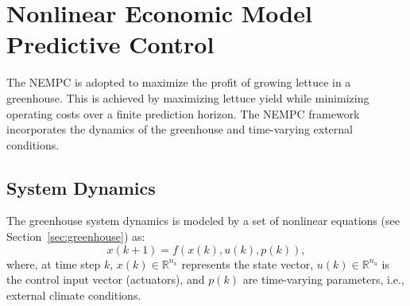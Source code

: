 \documentclass[conference]{IEEEtran}
\newcommand{\ui}[2]{#1_{\mathrm{#2}}}
\newcommand{\coo}{\ensuremath{\mathrm{CO_2}}}
\begin{document}







%
\section{Nonlinear Economic Model Predictive Control}\label{sec:mpc}
The NEMPC is adopted to maximize the profit of growing lettuce in a greenhouse. This is achieved by maximizing lettuce yield while minimizing operating costs over a finite prediction horizon. The NEMPC framework incorporates the dynamics of the greenhouse and time-varying external conditions.

\subsection{System Dynamics}\label{subsec:mpc_dynamics}
The greenhouse system dynamics is modeled by a set of nonlinear equations (see Section~\ref{sec:greenhouse}) as:
\begin{equation}
    x(k+1) = f\left( x(k), u(k), p(k) \right),
\end{equation}
where, at time step \(k\), \(x(k) \in \mathbb{R}^{n_x}\) represents the state vector, \(u(k) \in \mathbb{R}^{n_u}\) is the control input vector (actuators), and \(p(k)\) are time-varying parameters, i.e., external climate conditions.
\end{document}

